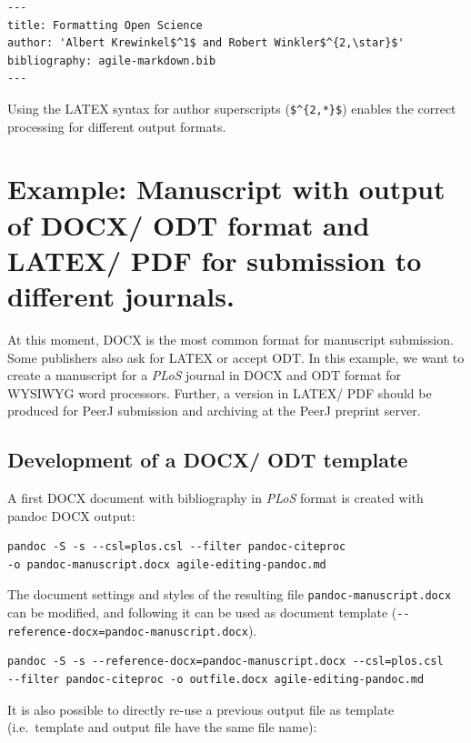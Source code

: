 \documentclass[10pt,fleqn]{wlpeerj}
\begin{document}
\begin{verbatim}
---
title: Formatting Open Science
author: 'Albert Krewinkel$^1$ and Robert Winkler$^{2,\star}$'
bibliography: agile-markdown.bib
---
\end{verbatim}

Using
the
LATEX
syntax
for
author
superscripts
(\texttt{\$\^{}\{2,*\}\$})
enables
the
correct
processing
for
different
output
formats.

\section{Example:
Manuscript
with
output
of
DOCX/
ODT
format
and
LATEX/
PDF
for
submission
to
different
journals.}\label{example-manuscript-with-output-of-docx-odt-format-and-latex-pdf-for-submission-to-different-journals.}

At
this
moment,
DOCX
is
the
most
common
format
for
manuscript
submission.
Some
publishers
also
ask
for
LATEX
or
accept
ODT.
In
this
example,
we
want
to
create
a
manuscript
for a
\emph{PLoS}
journal
in
DOCX
and
ODT
format
for
WYSIWYG
word
processors.
Further,
a
version
in
LATEX/
PDF
should
be
produced
for
PeerJ
submission
and
archiving
at
the
PeerJ
preprint
server.

\subsection{Development
of a
DOCX/
ODT
template}\label{development-of-a-docx-odt-template}

A
first
DOCX
document
with
bibliography
in
\emph{PLoS}
format
is
created
with
pandoc
DOCX
output:

\begin{verbatim}
pandoc -S -s --csl=plos.csl --filter pandoc-citeproc
-o pandoc-manuscript.docx agile-editing-pandoc.md
\end{verbatim}

The
document
settings
and
styles
of
the
resulting
file
\texttt{pandoc-manuscript.docx}
can
be
modified,
and
following
it
can
be
used
as
document
template
(\texttt{-\/-reference-docx=pandoc-manuscript.docx}).

\begin{verbatim}
pandoc -S -s --reference-docx=pandoc-manuscript.docx --csl=plos.csl
--filter pandoc-citeproc -o outfile.docx agile-editing-pandoc.md
\end{verbatim}

It is
also
possible
to
directly
re-use
a
previous
output
file
as
template
(i.e.~template
and
output
file
have
the
same
file
name):
\end{document}
